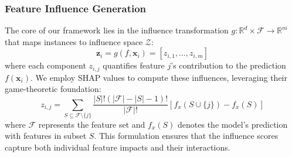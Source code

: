 \documentclass[final,5p,times,twocolumn,numbers]{elsarticle}
\begin{document}
\subsubsection{Feature Influence Generation}
The core of our framework lies in the influence transformation $g: \mathbb{R}^d \times \mathcal{F} \to \mathbb{R}^m$ that maps instances to influence space $\mathcal{Z}$:
\begin{equation}
    \mathbf{z}_i = g(f, \mathbf{x}_i) = [z_{i,1}, \ldots, z_{i,m}]
\end{equation}
where each component $z_{i,j}$ quantifies feature $j$'s contribution to the prediction $f(\mathbf{x}_i)$. We employ SHAP values to compute these influences, leveraging their game-theoretic foundation:
\begin{equation}
    z_{i,j} = \sum_{S \subseteq \mathcal{F}\setminus\{j\}} \frac{|S|!(|\mathcal{F}|-|S|-1)!}{|\mathcal{F}|!}[f_x(S \cup \{j\}) - f_x(S)]
\end{equation}
where $\mathcal{F}$ represents the feature set and $f_x(S)$ denotes the model's prediction with features in subset $S$. This formulation ensures that the influence scores capture both individual feature impacts and their interactions.
\end{document}
